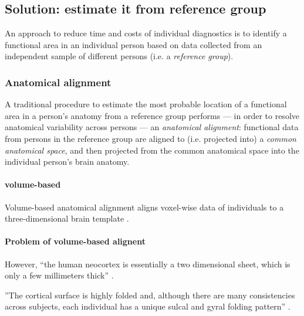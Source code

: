 \subsection{Solution: estimate it from reference group}

An approach to reduce time and costs of individual diagnostics is to identify a
functional area in an individual person based on data collected from an
independent sample of different persons (i.e. a \textit{reference group}).


\subsubsection{Anatomical alignment}

%
A traditional procedure \citep{frost2012measuring, weiner2018defining,
zhen2017quantifying, zhen2015quantifying, rosenke2021probabilistic,
wang2015probabilistic} to estimate the most probable location of a functional
area in a person's anatomy from a reference group performs --- in order to
resolve anatomical variability across persons --- an \textit{anatomical
alignment}:
%
functional data from persons in the reference group are aligned to (i.e.
projected into) a \textit{common anatomical space}, and then projected from the
common anatomical space into the individual person's brain anatomy.


\paragraph{volume-based}
Volume-based anatomical alignment \citep[s.][for a review]{klein2009evaluation}
aligns voxel-wise data of individuals to a three-dimensional brain template
\citep[e.g., MNI152 template;][]{fonov2011unbiased}.


\paragraph{Problem of volume-based alignent}

However, ``the human neocortex is essentially a two dimensional sheet, which is
only a few millimeters thick'' \citep{frost2012measuring}.

%
''The cortical surface is highly folded and, although there are many
consistencies across subjects, each individual has a unique sulcal and gyral
folding pattern'' \citep{frost2012measuring}.

